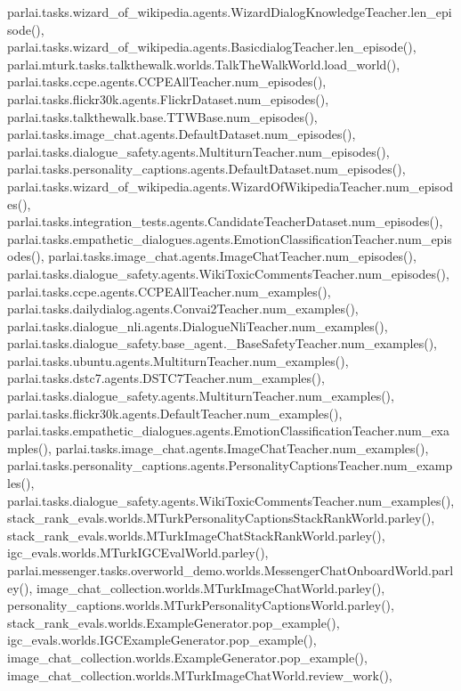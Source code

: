 parlai.\+tasks.\+wizard\+\_\+of\+\_\+wikipedia.\+agents.\+Wizard\+Dialog\+Knowledge\+Teacher.\+len\+\_\+episode(), parlai.\+tasks.\+wizard\+\_\+of\+\_\+wikipedia.\+agents.\+Basicdialog\+Teacher.\+len\+\_\+episode(), parlai.\+mturk.\+tasks.\+talkthewalk.\+worlds.\+Talk\+The\+Walk\+World.\+load\+\_\+world(), parlai.\+tasks.\+ccpe.\+agents.\+C\+C\+P\+E\+All\+Teacher.\+num\+\_\+episodes(), parlai.\+tasks.\+flickr30k.\+agents.\+Flickr\+Dataset.\+num\+\_\+episodes(), parlai.\+tasks.\+talkthewalk.\+base.\+T\+T\+W\+Base.\+num\+\_\+episodes(), parlai.\+tasks.\+image\+\_\+chat.\+agents.\+Default\+Dataset.\+num\+\_\+episodes(), parlai.\+tasks.\+dialogue\+\_\+safety.\+agents.\+Multiturn\+Teacher.\+num\+\_\+episodes(), parlai.\+tasks.\+personality\+\_\+captions.\+agents.\+Default\+Dataset.\+num\+\_\+episodes(), parlai.\+tasks.\+wizard\+\_\+of\+\_\+wikipedia.\+agents.\+Wizard\+Of\+Wikipedia\+Teacher.\+num\+\_\+episodes(), parlai.\+tasks.\+integration\+\_\+tests.\+agents.\+Candidate\+Teacher\+Dataset.\+num\+\_\+episodes(), parlai.\+tasks.\+empathetic\+\_\+dialogues.\+agents.\+Emotion\+Classification\+Teacher.\+num\+\_\+episodes(), parlai.\+tasks.\+image\+\_\+chat.\+agents.\+Image\+Chat\+Teacher.\+num\+\_\+episodes(), parlai.\+tasks.\+dialogue\+\_\+safety.\+agents.\+Wiki\+Toxic\+Comments\+Teacher.\+num\+\_\+episodes(), parlai.\+tasks.\+ccpe.\+agents.\+C\+C\+P\+E\+All\+Teacher.\+num\+\_\+examples(), parlai.\+tasks.\+dailydialog.\+agents.\+Convai2\+Teacher.\+num\+\_\+examples(), parlai.\+tasks.\+dialogue\+\_\+nli.\+agents.\+Dialogue\+Nli\+Teacher.\+num\+\_\+examples(), parlai.\+tasks.\+dialogue\+\_\+safety.\+base\+\_\+agent.\+\_\+\+Base\+Safety\+Teacher.\+num\+\_\+examples(), parlai.\+tasks.\+ubuntu.\+agents.\+Multiturn\+Teacher.\+num\+\_\+examples(), parlai.\+tasks.\+dstc7.\+agents.\+D\+S\+T\+C7\+Teacher.\+num\+\_\+examples(), parlai.\+tasks.\+dialogue\+\_\+safety.\+agents.\+Multiturn\+Teacher.\+num\+\_\+examples(), parlai.\+tasks.\+flickr30k.\+agents.\+Default\+Teacher.\+num\+\_\+examples(), parlai.\+tasks.\+empathetic\+\_\+dialogues.\+agents.\+Emotion\+Classification\+Teacher.\+num\+\_\+examples(), parlai.\+tasks.\+image\+\_\+chat.\+agents.\+Image\+Chat\+Teacher.\+num\+\_\+examples(), parlai.\+tasks.\+personality\+\_\+captions.\+agents.\+Personality\+Captions\+Teacher.\+num\+\_\+examples(), parlai.\+tasks.\+dialogue\+\_\+safety.\+agents.\+Wiki\+Toxic\+Comments\+Teacher.\+num\+\_\+examples(), stack\+\_\+rank\+\_\+evals.\+worlds.\+M\+Turk\+Personality\+Captions\+Stack\+Rank\+World.\+parley(), stack\+\_\+rank\+\_\+evals.\+worlds.\+M\+Turk\+Image\+Chat\+Stack\+Rank\+World.\+parley(), igc\+\_\+evals.\+worlds.\+M\+Turk\+I\+G\+C\+Eval\+World.\+parley(), parlai.\+messenger.\+tasks.\+overworld\+\_\+demo.\+worlds.\+Messenger\+Chat\+Onboard\+World.\+parley(), image\+\_\+chat\+\_\+collection.\+worlds.\+M\+Turk\+Image\+Chat\+World.\+parley(), personality\+\_\+captions.\+worlds.\+M\+Turk\+Personality\+Captions\+World.\+parley(), stack\+\_\+rank\+\_\+evals.\+worlds.\+Example\+Generator.\+pop\+\_\+example(), igc\+\_\+evals.\+worlds.\+I\+G\+C\+Example\+Generator.\+pop\+\_\+example(), image\+\_\+chat\+\_\+collection.\+worlds.\+Example\+Generator.\+pop\+\_\+example(), image\+\_\+chat\+\_\+collection.\+worlds.\+M\+Turk\+Image\+Chat\+World.\+review\+\_\+work(), 